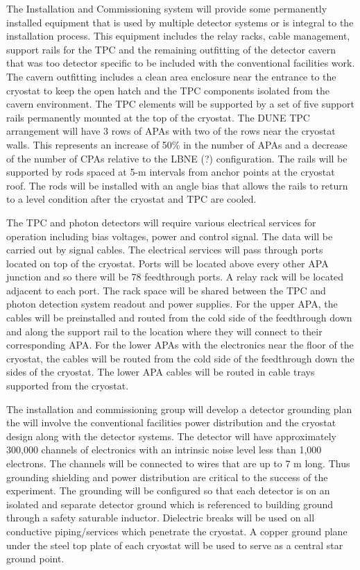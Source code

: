 The Installation and Commissioning system will provide some permanently installed equipment that is 
used by multiple detector systems or is integral to the installation process. This equipment includes the 
relay racks, cable management, support rails for the TPC and the remaining outfitting of the detector 
cavern that was too detector specific to be included with the conventional facilities work. The cavern 
outfitting includes a clean area enclosure near the entrance to the cryostat to keep the open hatch and the 
TPC components isolated from the cavern environment. The TPC elements will be supported by a set of 
five support rails permanently mounted at the top of the cryostat. The DUNE TPC arrangement will have 3 
rows of APAs with two of the rows near the cryostat walls. This represents an increase of 50\% in the 
number of APAs and a decrease of the number of CPAs relative to the LBNE (?) configuration. The rails will 
be supported by rods spaced at 5-m intervals from anchor points at the cryostat roof. The rods will be 
installed with an angle bias that allows the rails to return to a level condition after the cryostat and TPC are
cooled. 

The TPC and photon detectors will require various electrical services for operation including bias voltages, 
power and control signal. The data will be carried out by signal cables. The electrical services will pass 
through ports located on top of the cryostat. Ports will be located above every other APA junction and so 
there will be 78 feedthrough ports. A relay rack will be located adjacent to each port. The rack space will 
be shared between the TPC and photon detection system readout and power supplies. For the upper APA, 
the cables will be preinstalled and routed from the cold side of the feedthrough down and along the 
support rail to the location where they will connect to their corresponding APA. For the lower APAs with 
the electronics near the floor of the cryostat, the cables will be routed from the cold side of the 
feedthrough down the sides of the cryostat. The lower APA cables will be routed in cable trays supported 
from the cryostat.

The installation and commissioning group will develop a detector grounding plan the will involve the 
conventional facilities power distribution and the cryostat design along with the detector systems.  The 
detector will have approximately 300,000 channels of electronics with an intrinsic noise level less than 
1,000 electrons. The channels will be connected to wires that are up to 7 m long. Thus grounding 
shielding and power distribution are critical to the success of the experiment. The grounding will be 
configured so that each detector is on an isolated and separate detector ground which is referenced to 
building ground through a safety saturable inductor.  Dielectric breaks will be used on all conductive 
piping/services which penetrate the cryostat.  A copper ground plane under the steel top plate of each 
cryostat will be used to serve as a central star ground point. 

